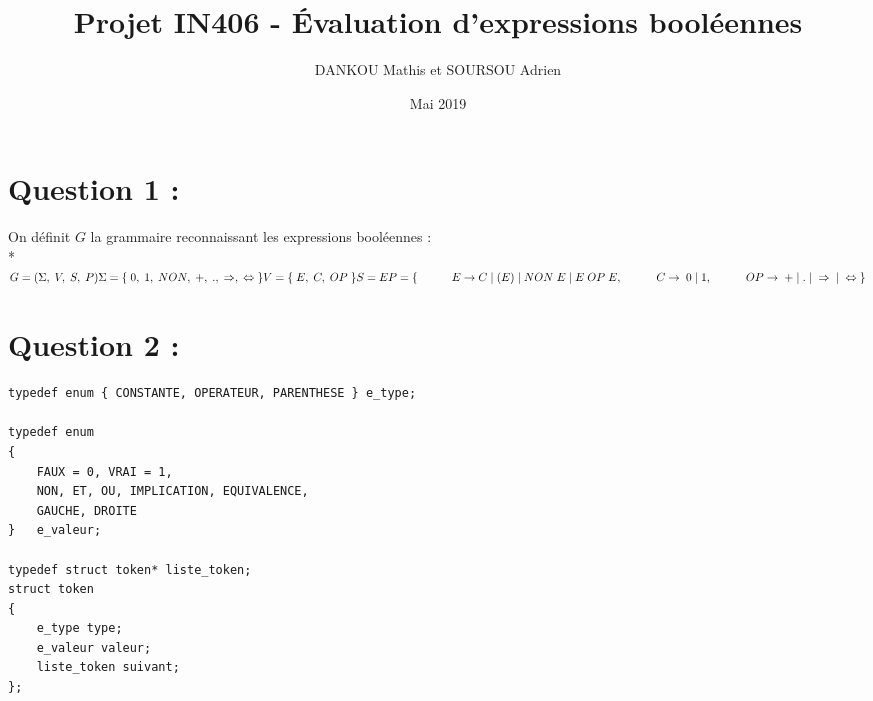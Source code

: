 \documentclass{article}
\title{Projet IN406 - Évaluation d’expressions booléennes}
\author{DANKOU Mathis et SOURSOU Adrien}
\date{Mai 2019}
\begin{document}
\maketitle
\section*{Question 1 :}
On définit $G$ la grammaire reconnaissant les expressions booléennes :
\vspace{5px}\\*
\begin{math}
    G = (\Sigma,\;V,\;S,\;P)\\
	\Sigma =\{\;0,\;1,\;NON,\;+,\;.,\;\Rightarrow,\;\Leftrightarrow\;\}\\
    V = \{\;E,\;C,\;OP\;\}\\
    S = E\\ 
    P = \{ \\
    \hspace*{7ex} E\rightarrow C\;|\;(E)\;|\;NON \;E\;|\;E\;OP\;E, \\
    \hspace*{7ex} C\rightarrow \;0\;|\;1, \\
    \hspace*{7ex} OP\rightarrow \;+\;|\;.\;|\;\Rightarrow\;|\;\Leftrightarrow \\
    \}
\end{math}

\section*{Question 2 :}
\begin{verbatim}
typedef enum { CONSTANTE, OPERATEUR, PARENTHESE } e_type;

typedef enum
{
    FAUX = 0, VRAI = 1,
    NON, ET, OU, IMPLICATION, EQUIVALENCE,
    GAUCHE, DROITE
}   e_valeur;

typedef struct token* liste_token;
struct token
{
    e_type type;
    e_valeur valeur;
    liste_token suivant;
};
\end{verbatim}
\end{document}
